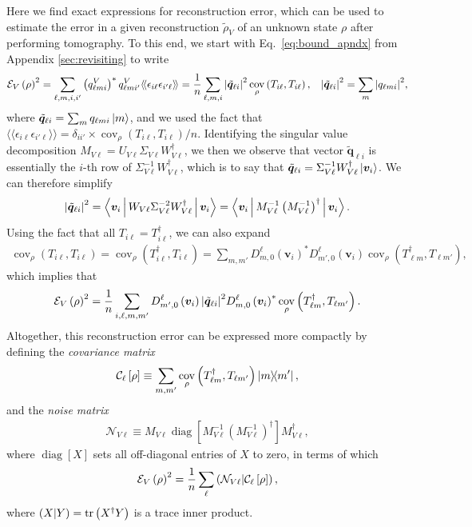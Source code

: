 \documentclass[notitlepage,twocolumn]{revtex4-2}
\newcommand{\f}[2]{\dfrac{#1}{#2}} %
\newcommand{\p}[1]{\left(#1\right)} %
\renewcommand{\sp}[1]{\left[#1\right]} %
\newcommand{\bk}{\Braket} %
\renewcommand{\v}{\bm} %
\newcommand{\bbk}[1]{\langle\!\langle #1 \rangle\!\rangle}
\newcommand{\C}{\mathcal{C}}
\newcommand{\E}{\mathcal{E}}
\newcommand{\N}{\mathcal{N}}
\def\obk#1{\mathinner{({#1})}}
\DeclareMathOperator{\cov}{cov}
\DeclareMathOperator{\diag}{diag}
\begin{document}
Here we find exact expressions for reconstruction error, which can be used to estimate the error in a given reconstruction $\tilde\rho_V$ of an unknown state $\rho$ after performing tomography.
To this end, we start with Eq.~\eqref{eq:bound_apndx} from Appendix \ref{sec:revisiting} to write
\begin{align}
  \E_V\p{\rho}^2
  = \sum_{\ell,m,i,i'} \p{q^V_{\ell mi}}^* q^V_{\ell mi'} \bbk{\epsilon_{i\ell}\epsilon_{i'\ell}}
  = \f1n \sum_{\ell,m,i} \abs{\tilde{\v q}_{\ell i}}^2 \cov_\rho\p{T_{i\ell},T_{i\ell}},
  &&
  \abs{\tilde{\v q}_{\ell i}}^2 = \sum_m \abs{q_{\ell mi}}^2,
  \label{eq:error_SM_start}
\end{align}
where $\tilde{\v q}_{\ell i} = \sum_m q_{\ell mi} \ket{m}$, and we used the fact that $\bbk{\epsilon_{i\ell}\epsilon_{i'\ell}} = \delta_{ii'}\times\cov_\rho\p{T_{i\ell},T_{i\ell}}/n$.
Identifying the singular value decomposition $M_{V\ell} = U_{V\ell} \Sigma_{V\ell} W_{V\ell}^\dag$, we then we observe that vector $\tilde{\v q}_{\ell i}$ is essentially the $i$-th row of $\Sigma_{V\ell}^{-1} W_{V\ell}^\dag$, which is to say that $\tilde{\v q}_{\ell i} = \Sigma_{V\ell}^{-1} W_{V\ell}^\dag \ket{\v v_i}$.
We can therefore simplify
\begin{align}
  \abs{\tilde{\v q}_{\ell i}}^2
  = \bk{\v v_i | W_{V\ell} \Sigma_{V\ell}^{-2} W_{V\ell}^\dag | \v v_i}
  = \bk{\v v_i| M_{V\ell}^{-1} \p{M_{V\ell}^{-1}}^\dag | \v v_i}.
\end{align}
Using the fact that all $T_{i\ell}=T_{i\ell}^\dag$, we can also expand
\begin{align}
  \cov_\rho\p{T_{i\ell},T_{i\ell}}
  = \cov_\rho\p{T_{i\ell}^\dag,T_{i\ell}}
  = \sum_{m,m'} D^\ell_{m,0}\p{\v v_i}^* D^\ell_{m',0}\p{\v v_i}
  \cov_\rho\p{T_{\ell m}^\dag, T_{\ell m'}},
\end{align}
which implies that
\begin{align}
  \E_V\p{\rho}^2
  = \f1n \sum_{i,\ell,m,m'}
  D^\ell_{m',0}\p{\v v_i} \abs{\tilde{\v q}_{\ell i}}^2
  D^\ell_{m,0}\p{\v v_i}^*
  \cov_\rho\p{T_{\ell m}^\dag, T_{\ell m'}}.
\end{align}
Altogether, this reconstruction error can be expressed more compactly by defining the {\it covariance matrix}
\begin{align}
  \C_\ell\sp{\rho} \equiv
  \sum_{m,m'} \cov_\rho\p{T_{\ell m}^\dag, T_{\ell m'}} \op{m}{m'},
\end{align}
and the {\it noise matrix}
\begin{align}
  \N_{V\ell} \equiv M_{V\ell} \diag\sp{M_{V\ell}^{-1}
    \p{M_{V\ell}^{-1}}^\dag} M_{V\ell}^\dag,
\end{align}
where $\diag\sp{X}$ sets all off-diagonal entries of $X$ to zero, in terms of which
\begin{align}
  \E_V\p{\rho}^2 = \f1n \sum_\ell \obk{\N_{V\ell}|\C_\ell\sp{\rho}},
  \label{eq:error_SM_mid}
\end{align}
where $\obk{X|Y}=\tr\p{X^\dag Y}$ is a trace inner product.
\end{document}
